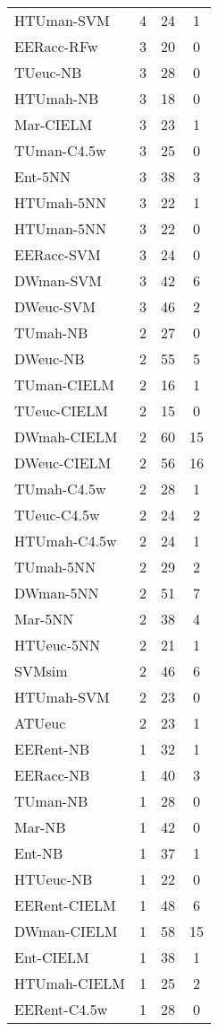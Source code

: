\begin{table}[h]
\begin{center}
{\begin{tabular}{lccc}
HTUman-SVM & 4 & 24 & 1 \\
EERacc-RFw & 3 & 20 & 0 \\
TUeuc-NB   & 3 & 28 & 0 \\
HTUmah-NB  & 3 & 18 & 0 \\
Mar-CIELM  & 3 & 23 & 1 \\
TUman-C4.5w & 3 & 25 & 0 \\
Ent-5NN    & 3 & 38 & 3 \\
HTUmah-5NN & 3 & 22 & 1 \\
HTUman-5NN & 3 & 22 & 0 \\
EERacc-SVM & 3 & 24 & 0 \\
DWman-SVM  & 3 & 42 & 6 \\
DWeuc-SVM  & 3 & 46 & 2 \\
TUmah-NB   & 2 & 27 & 0 \\
DWeuc-NB   & 2 & 55 & 5 \\
TUman-CIELM & 2 & 16 & 1 \\
TUeuc-CIELM & 2 & 15 & 0 \\
DWmah-CIELM & 2 & 60 & 15 \\
DWeuc-CIELM & 2 & 56 & 16 \\
TUmah-C4.5w & 2 & 28 & 1 \\
TUeuc-C4.5w & 2 & 24 & 2 \\
HTUmah-C4.5w & 2 & 24 & 1 \\
TUmah-5NN  & 2 & 29 & 2 \\
DWman-5NN  & 2 & 51 & 7 \\
Mar-5NN    & 2 & 38 & 4 \\
HTUeuc-5NN & 2 & 21 & 1 \\
SVMsim     & 2 & 46 & 6 \\
HTUmah-SVM & 2 & 23 & 0 \\
ATUeuc     & 2 & 23 & 1 \\
EERent-NB  & 1 & 32 & 1 \\
EERacc-NB  & 1 & 40 & 3 \\
TUman-NB   & 1 & 28 & 0 \\
Mar-NB     & 1 & 42 & 0 \\
Ent-NB     & 1 & 37 & 1 \\
HTUeuc-NB  & 1 & 22 & 0 \\
EERent-CIELM & 1 & 48 & 6 \\
DWman-CIELM & 1 & 58 & 15 \\
Ent-CIELM  & 1 & 38 & 1 \\
HTUmah-CIELM & 1 & 25 & 2 \\
EERent-C4.5w & 1 & 28 & 0 \\

\end{tabular}}
\end{center}
\end{table}

